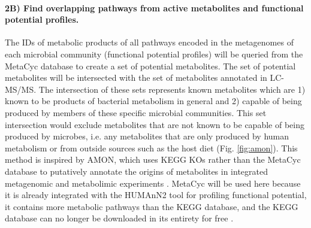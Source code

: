 \documentclass[11pt]{article}
\begin{document}
\paragraph{2B) Find overlapping pathways from active metabolites and functional potential profiles.}

\begin{figure}
    \vspace{-8pt}
\end{figure}
The IDs of metabolic products of all pathways encoded in the metagenomes of each microbial community (functional potential profiles) will be queried from the MetaCyc database to create a set of potential metabolites.
The set of potential metabolites will be intersected with the set of metabolites annotated in LC-MS/MS.
The intersection of these sets represents known metabolites which are 1) known to be products of bacterial metabolism in general and 2) capable of being produced by members of these specific microbial communities.
This set intersection would exclude metabolites that are not known to be capable of being produced by microbes, i.e. any metabolites that are only produced by human metabolism or from outside sources such as the host diet (Fig. \ref{fig:amon}).
This method is inspired by AMON, which uses KEGG KOs rather than the MetaCyc database to putatively annotate the origins of metabolites in integrated metagenomic and metabolimic experiments \cite{shaffer_amon_2019}.
MetaCyc will be used here because it is already integrated with the HUMAnN2 tool for profiling functional potential,
it contains more metabolic pathways than the KEGG database,
and the KEGG database can no longer be downloaded in its entirety for free \cite{caspi_metacyc_2020}.
\end{document}

